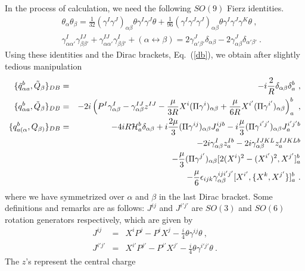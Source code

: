 \documentclass[a4paper,12pt]{article}
\begin{document}
In the process of calculation, we need the following $SO(9)$ Fierz
identities.
\begin{eqnarray}
& &\theta_\alpha \theta_\beta = \frac{1}{32} (\gamma^I \gamma^J
)_{\alpha \beta} \theta \gamma^I \gamma^J \theta + \frac{1}{96}
(\gamma^I \gamma^J \gamma^J)_{\alpha \beta} \theta \gamma^I
\gamma^J \gamma^K \theta~,
                                \nonumber \\
& & \gamma^I_{\alpha \alpha'} \gamma^{IJ}_{\beta \beta'} +
\gamma^{IJ}_{\alpha \alpha'} \gamma^I_{\beta \beta'}+ (\alpha
\leftrightarrow \beta) = 2 \gamma^J_{\alpha' \beta'}
\delta_{\alpha \beta} - 2 \gamma^J_{\alpha \beta} \delta_{\alpha'
\beta'}~.
\label{fierz}
\end{eqnarray}
Using these identities and the Dirac brackets, Eq.~(\ref{db}), we
obtain after slightly tedious manipulation
\begin{eqnarray}
\{ \tilde{q}_{\alpha a}^b, \tilde{Q}_\beta \}_{DB}
 &=& - i \frac{2}{R} \delta_{\alpha \beta} \delta^b_a~,
                                    \nonumber \\
\{ q_{\alpha a}^b, \tilde{Q}_\beta \}_{DB}
 &=& -2 i \left( P^I \gamma^I_{\alpha \beta}
     - \gamma^{IJ}_{\alpha \beta} z^{IJ}
    - \frac{\mu}{3R} X^i (\Pi \gamma^i)_{\alpha\beta}
    + \frac{\mu}{6R} X^{i'} (\Pi \gamma^{i'})_{\alpha\beta}
    \right)^b_a~,
                                    \nonumber \\
\{ q_{a (\alpha}^b, Q_{\beta)} \}_{DB}
 &=& -4i R {\cal H}_a^b \delta_{\alpha\beta}
   +i \frac{2\mu}{3} (\Pi \gamma^{ij} )_{\alpha\beta} J^{ijb}_a
   -i \frac{\mu}{3} (\Pi \gamma^{i'j'})_{\alpha\beta}J^{i'j'b}_a
                                    \nonumber \\
 & &
   -2i \gamma^I_{\alpha\beta} z_a^{Ib}
   -2i \gamma^{IJKL}_{\alpha\beta} z_a^{IJKLb}
                                    \nonumber \\
 & & - \frac{\mu}{3} (\Pi \gamma^{j'})_{\alpha\beta}
     [ 2(X^i)^2 - (X^{i'})^2, X^{j'} ]^b_a
                                    \nonumber \\
 & &
     - \frac{\mu}{6} \epsilon_{ijk} \gamma^{iji'j'}_{\alpha\beta}
     [ X^{i'}, \{ X^k, X^{j'} \} ]^b_a~.
\label{susy-alg}
\end{eqnarray}
where we have symmetrized over $\alpha$ and $\beta$ in the last
Dirac bracket.  Some definitions and remarks are as follows:
$J^{ij}$ and $J^{i'j'}$ are $SO(3)$ and $SO(6)$ rotation
generators respectively, which are given by
\begin{eqnarray}
J^{ij} &=&  X^i P^j - P^i X^j
          - \frac{i}{4} \theta \gamma^{ij} \theta~,
                                    \nonumber \\
J^{i'j'} &=& X^{i'} P^{j'} - P^{i'} X^{j'}
           - \frac{i}{4} \theta \gamma^{i'j'} \theta~.
\label{ang}\end{eqnarray} The $z$'s represent the central charge
\end{document}
